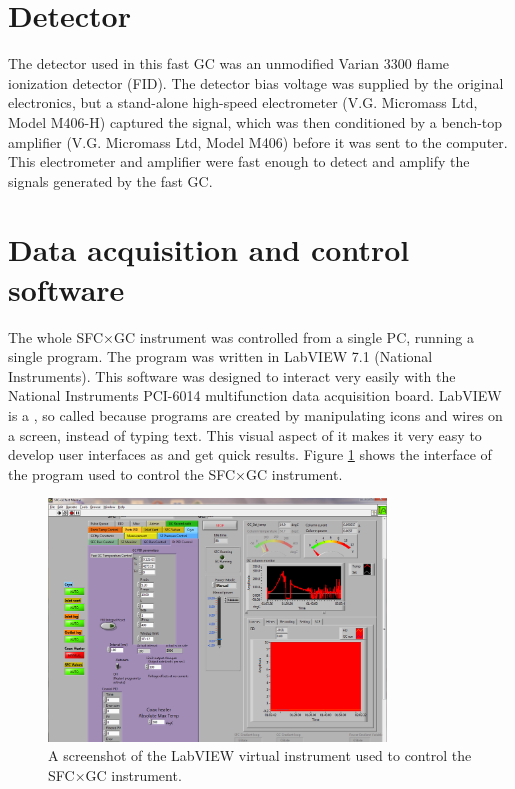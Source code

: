 
\section{Detector}

The detector used in this fast GC was an unmodified Varian\texttrademark{} 3300
flame ionization detector (FID). The detector bias voltage was supplied by the
original electronics, but a stand-alone high-speed electrometer (V.G. Micromass
Ltd, Model M406-H) captured the signal, which was then conditioned by a
bench-top amplifier (V.G. Micromass Ltd, Model M406) before it was sent to the
computer. This electrometer and amplifier were fast enough to detect and amplify
the signals generated by the fast GC.

\section{Data acquisition and control software}

The whole SFC×GC instrument was controlled from a single PC, running a single
program. The program was written in LabVIEW 7.1\texttrademark{} (National
Instruments). This software was designed to interact very easily with the
National Instruments PCI-6014 multifunction data acquisition board. LabVIEW is a
, so called because programs are created by
manipulating icons and wires on a screen, instead of typing text. This visual
aspect of it makes it very easy to develop user interfaces as
 and get quick results. Figure \ref{fig:SFCGCFastVI}
shows the interface of the program used to control the SFC×GC instrument.

\begin{figure}
	\centering
	\includegraphics[width=0.8\textwidth]{Figures/Screenshot.png}
	\decoRule
	
	\caption[The main LabVIEW VI]{A screenshot of the LabVIEW virtual instrument
	used to control the SFC×GC instrument.}
	
	\label{fig:SFCGCFastVI}
\end{figure}


